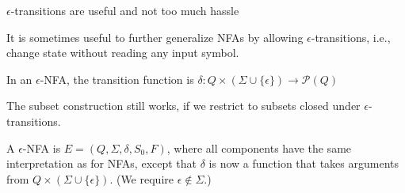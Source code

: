 \documentclass[handout]{beamer}
\begin{document}
\begin{frame}{$\epsilon$-transitions are useful and not too much hassle}

    It is sometimes useful to further generalize NFAs by allowing \alert{$\epsilon$-transitions}, i.e., change state without reading any input symbol.

    \bigskip

    In an \alert{$\epsilon$-NFA}, the transition function is $\delta:Q \times (\Sigma\cup \{\epsilon\})\to\mathcal{P}(Q)$
    
    \bigskip

    The subset construction still works, if we restrict to subsets closed under $\epsilon$-transitions.

    \bigskip

    \begin{definition}
        A \alert{$\epsilon$-NFA} is $E=(Q,\Sigma,\delta,S_0,F)$, where all components have the same interpretation as for NFAs, except that $\delta$ is now a function that takes arguments from $Q \times (\Sigma\cup \{\epsilon\})$. (We require $\epsilon \notin \Sigma$.)
    \end{definition}

\end{frame}
\end{document}
